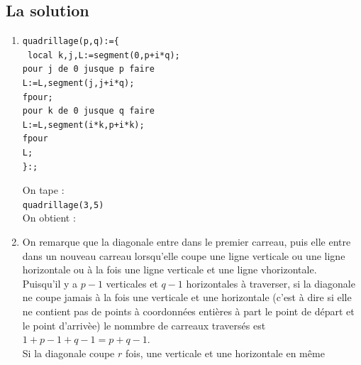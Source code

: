 \documentclass[a4paper,11pt]{book}
\begin{document}
\subsection{La solution}
\begin{enumerate}
\item 
\begin{verbatim}
quadrillage(p,q):={
 local k,j,L:=segment(0,p+i*q);
pour j de 0 jusque p faire
L:=L,segment(j,j+i*q);
fpour; 
pour k de 0 jusque q faire 
L:=L,segment(i*k,p+i*k);
fpour
L;
}:;
\end{verbatim}
On tape :\\
{\tt quadrillage(3,5)}\\
On obtient :\\
\item 
On remarque que la diagonale entre dans le premier carreau, puis elle entre 
dans un nouveau carreau lorsqu'elle coupe 
une ligne verticale ou une ligne horizontale ou \`a la fois une ligne verticale
et une ligne vhorizontale.\\
Puisqu'il y a $p-1$ verticales et $q-1$ horizontales \`a traverser, 
si la diagonale ne coupe jamais \`a la fois une verticale et une horizontale 
(c'est \`a dire si elle ne contient pas de points \`a coordonn\'ees enti\`eres
\`a part le point de d\'epart et le point d'arriv\`ee) le 
nommbre de carreaux travers\'es est $1+p-1+q-1=p+q-1$.\\ 
Si la diagonale coupe $r$ fois, une verticale et une horizontale en m\^eme 

\end{enumerate}
\end{document}
